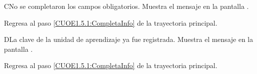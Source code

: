 \begin{UCtrayectoriaA}{C}{No se completaron los campos obligatorios.}
	\UCpaso [\UCsist] Muestra el mensaje  en la pantalla . 
	
	\UCpaso Regresa al paso \ref{CUOE1.5.1:CompletaInfo} de la trayectoria principal.
\end{UCtrayectoriaA}

\begin{UCtrayectoriaA}{D}{La clave de la unidad de aprendizaje ya fue registrada.}
	\UCpaso [\UCsist] Muestra el mensaje  en la pantalla .
	
	\UCpaso Regresa al paso \ref{CUOE1.5.1:CompletaInfo} de la trayectoria principal.
\end{UCtrayectoriaA}


